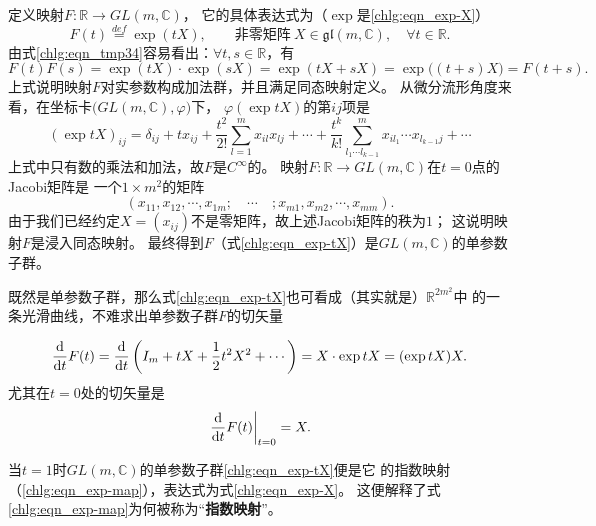 定义映射$F:\mathbb{R}\to GL(m,\mathbb{C})$，
它的具体表达式为（$\exp$是\eqref{chlg:eqn_exp-X}）
\begin{equation}\label{chlg:eqn_exp-tX}
   F(t) \overset{def}{=} \exp(t X),\qquad \text{非零矩阵}\ 
      X \in \mathfrak{gl}(m,\mathbb{C}),\quad \forall t\in \mathbb{R} .
\end{equation}
由式\eqref{chlg:eqn_tmp34}容易看出：$\forall t,s \in \mathbb{R}$，有
\begin{equation*}
    F(t)F(s) = \exp(t X) \cdot \exp(s X) = \exp(t X + s X)
    =\exp\bigl((t+s) X\bigr) = F(t+s) .
\end{equation*}
上式说明映射$F$对实参数构成加法群，并且满足同态映射定义。
从微分流形角度来看，在坐标卡$\bigl(GL(m,\mathbb{C}),\varphi \bigr)$下，
$\varphi(\exp tX)$的第$ij$项是
\begin{equation*}
    (\exp tX )_{ij} = \delta_{ij} + t x_{ij} + \frac{t^2}{2!} \sum_{l=1}^{m} x_{il} x_{lj}
    + \cdots + \frac{t^k}{k!} \sum_{l_1\cdots l_{k-1}}^{m} x_{il_1} \cdots x_{l_{k-1} j}
    + \cdots 
\end{equation*}
上式中只有数的乘法和加法，故$F$是$C^\infty$的。
映射$F:\mathbb{R}\to GL(m,\mathbb{C})$在$t=0$点的Jacobi矩阵是
一个$1\times m^2$的矩阵
\begin{equation}
    (x_{11},x_{12},\cdots,x_{1m};\quad\cdots\quad;x_{m1},x_{m2},\cdots,x_{mm}) .
\end{equation}
由于我们已经约定$X=(x_{ij})$不是零矩阵，故上述Jacobi矩阵的秩为$1$；
这说明映射$F$是浸入同态映射。
最终得到$F$（式\eqref{chlg:eqn_exp-tX}）是$GL(m,\mathbb{C})$的单参数子群。


既然是单参数子群，那么式\eqref{chlg:eqn_exp-tX}也可看成（其实就是）$\mathbb{R}^{2m^2}$中
的一条光滑曲线，不难求出单参数子群$F$的切矢量

\begin{equation}\label{chlg:eqn_Dexp-all}
    \frac{{\rm d}}{{\rm d}t} F(t)
    = \frac{{\rm d}}{{\rm d}t} \left(I_m + t X 
    +\frac{1}{2}t^2 X^2 +\cdots \right)
    = X \cdot \exp tX = (\exp tX) X .
\end{equation}
尤其在$t=0$处的切矢量是
\begin{equation}\label{chlg:eqn_Dexp}
    \left. \frac{{\rm d}}{{\rm d}t} F(t)\right|_{t=0}    = X .  
\end{equation}

当$t=1$时$GL(m,\mathbb{C})$的单参数子群\eqref{chlg:eqn_exp-tX}便是它
的{\kaishu 指数映射}（\eqref{chlg:eqn_exp-map}），表达式为式\eqref{chlg:eqn_exp-X}。
这便解释了式\eqref{chlg:eqn_exp-map}为何被称为“\textbf{指数映射}”。


